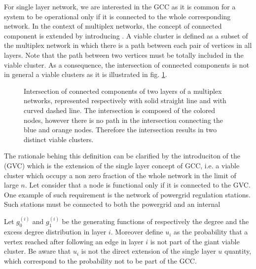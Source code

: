 \documentclass[
11pt, %
english, %
singlespacing, %
nolistspacing, %
liststotoc, %
headsepline, %
]{MastersDoctoralThesis} %
\begin{document}

For single layer network, we are interested in the GCC as it is common for a system to be operational only if it is connected to the whole corresponding network. In the context of multiplex networks, the concept of connected component is extended by introducing . A viable cluster is defined as a subset of the multiplex network in which there is a path between each pair of vertices in all layers. Note that the path between two vertices must be totally included in the viable cluster. As a consequence, the intersection of connected components is not in general a viable clusters as it is illustrated in fig. \ref{Figure: Intersection of connected is not viable}.

\begin{figure}
	
	\caption{Intersection of connected components of two layers of a multiplex networks, represented respectively with solid straight line and with curved dashed line. The intersection is composed of the colored nodes, however there is no path in the intersection connecting the blue and orange nodes. Therefore the intersection results in two distinct viable clusters.}
	\label{Figure: Intersection of connected is not viable}
\end{figure}

The rationale behing this definition can be clarified by the introduciton of the  (GVC) which is the extension of the single layer concept of GCC, i.e. a viable cluster which occupy a non zero fraction of the whole network in the limit of large $n$. Let consider that a node is functional only if it is connected to the GVC. One example of such requirement is the network of powergrid regulation stations. Such stations must be connected to both the powergrid and an internal

Let $g_0^{(i)}$ and $g_1^{(i)}$ be the generating functions of respectively the degree and the excess degree distribution in layer $i$. Moreover define $u_i$ as the probability that a vertex reached after following an edge in layer $i$ is not part of the giant viable cluster. Be aware that $u_i$ is not the direct extension of the single layer $u$ quantity, which correspond to the probability not to be part of the GCC.
\end{document}

